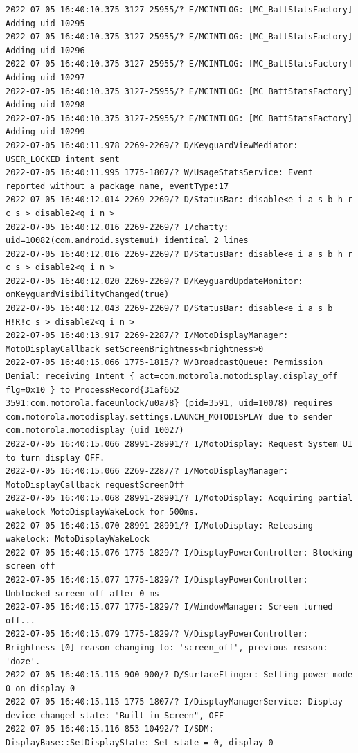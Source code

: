 \documentclass[a4paper,12pt]{book}
\begin{document}
\begin{lstlisting}
2022-07-05 16:40:10.375 3127-25955/? E/MCINTLOG: [MC_BattStatsFactory] Adding uid 10295
2022-07-05 16:40:10.375 3127-25955/? E/MCINTLOG: [MC_BattStatsFactory] Adding uid 10296
2022-07-05 16:40:10.375 3127-25955/? E/MCINTLOG: [MC_BattStatsFactory] Adding uid 10297
2022-07-05 16:40:10.375 3127-25955/? E/MCINTLOG: [MC_BattStatsFactory] Adding uid 10298
2022-07-05 16:40:10.375 3127-25955/? E/MCINTLOG: [MC_BattStatsFactory] Adding uid 10299
2022-07-05 16:40:11.978 2269-2269/? D/KeyguardViewMediator: USER_LOCKED intent sent
2022-07-05 16:40:11.995 1775-1807/? W/UsageStatsService: Event reported without a package name, eventType:17
2022-07-05 16:40:12.014 2269-2269/? D/StatusBar: disable<e i a s b h r c s > disable2<q i n >
2022-07-05 16:40:12.016 2269-2269/? I/chatty: uid=10082(com.android.systemui) identical 2 lines
2022-07-05 16:40:12.016 2269-2269/? D/StatusBar: disable<e i a s b h r c s > disable2<q i n >
2022-07-05 16:40:12.020 2269-2269/? D/KeyguardUpdateMonitor: onKeyguardVisibilityChanged(true)
2022-07-05 16:40:12.043 2269-2269/? D/StatusBar: disable<e i a s b H!R!c s > disable2<q i n >
2022-07-05 16:40:13.917 2269-2287/? I/MotoDisplayManager: MotoDisplayCallback setScreenBrightness<brightness>0
2022-07-05 16:40:15.066 1775-1815/? W/BroadcastQueue: Permission Denial: receiving Intent { act=com.motorola.motodisplay.display_off flg=0x10 } to ProcessRecord{31af652 3591:com.motorola.faceunlock/u0a78} (pid=3591, uid=10078) requires com.motorola.motodisplay.settings.LAUNCH_MOTODISPLAY due to sender com.motorola.motodisplay (uid 10027)
2022-07-05 16:40:15.066 28991-28991/? I/MotoDisplay: Request System UI to turn display OFF.
2022-07-05 16:40:15.066 2269-2287/? I/MotoDisplayManager: MotoDisplayCallback requestScreenOff
2022-07-05 16:40:15.068 28991-28991/? I/MotoDisplay: Acquiring partial wakelock MotoDisplayWakeLock for 500ms.
2022-07-05 16:40:15.070 28991-28991/? I/MotoDisplay: Releasing wakelock: MotoDisplayWakeLock
2022-07-05 16:40:15.076 1775-1829/? I/DisplayPowerController: Blocking screen off
2022-07-05 16:40:15.077 1775-1829/? I/DisplayPowerController: Unblocked screen off after 0 ms
2022-07-05 16:40:15.077 1775-1829/? I/WindowManager: Screen turned off...
2022-07-05 16:40:15.079 1775-1829/? V/DisplayPowerController: Brightness [0] reason changing to: 'screen_off', previous reason: 'doze'.
2022-07-05 16:40:15.115 900-900/? D/SurfaceFlinger: Setting power mode 0 on display 0
2022-07-05 16:40:15.115 1775-1807/? I/DisplayManagerService: Display device changed state: "Built-in Screen", OFF
2022-07-05 16:40:15.116 853-10492/? I/SDM: DisplayBase::SetDisplayState: Set state = 0, display 0

\end{lstlisting}
\end{document}
